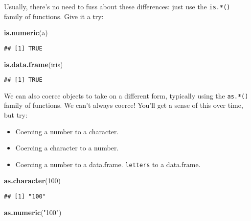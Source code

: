 \documentclass[]{article}
\newenvironment{Shaded}{\begin{snugshade}}{\end{snugshade}}
\newcommand{\KeywordTok}[1]{\textcolor[rgb]{0.13,0.29,0.53}{\textbf{#1}}}
\newcommand{\DecValTok}[1]{\textcolor[rgb]{0.00,0.00,0.81}{#1}}
\newcommand{\StringTok}[1]{\textcolor[rgb]{0.31,0.60,0.02}{#1}}
\newcommand{\NormalTok}[1]{#1}
\providecommand{\tightlist}{%
  \setlength{\itemsep}{0pt}\setlength{\parskip}{0pt}}
\begin{document}
Usually, there's no need to fuss about these differences: just use the
\texttt{is.*()} family of functions. Give it a try:

\begin{Shaded}
\begin{Highlighting}[]
\KeywordTok{is.numeric}\NormalTok{(a)}
\end{Highlighting}
\end{Shaded}

\begin{verbatim}
## [1] TRUE
\end{verbatim}

\begin{Shaded}
\begin{Highlighting}[]
\KeywordTok{is.data.frame}\NormalTok{(iris)}
\end{Highlighting}
\end{Shaded}

\begin{verbatim}
## [1] TRUE
\end{verbatim}

We can also coerce objects to take on a different form, typically using
the \texttt{as.*()} family of functions. We can't always coerce! You'll
get a sense of this over time, but try:

\begin{itemize}
\tightlist
\item
  Coercing a number to a character.
\item
  Coercing a character to a number.
\item
  Coercing a number to a data.frame. \texttt{letters} to a data.frame.
\end{itemize}

\begin{Shaded}
\begin{Highlighting}[]
\KeywordTok{as.character}\NormalTok{(}\DecValTok{100}\NormalTok{)}
\end{Highlighting}
\end{Shaded}

\begin{verbatim}
## [1] "100"
\end{verbatim}

\begin{Shaded}
\begin{Highlighting}[]
\KeywordTok{as.numeric}\NormalTok{(}\StringTok{"100"}\NormalTok{)}
\end{Highlighting}
\end{Shaded}
\end{document}
